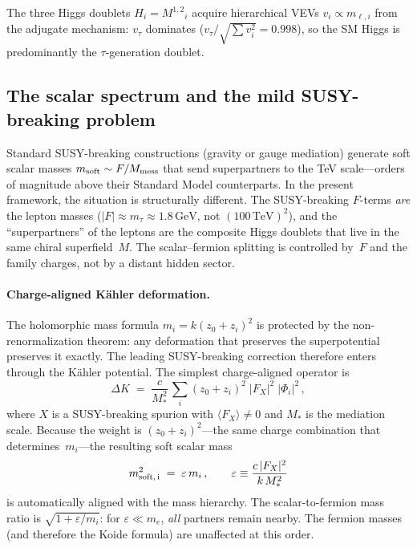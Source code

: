 \documentclass[12pt,a4paper]{article}
\newcommand{\GeV}{\,\mathrm{GeV}}
\newcommand{\TeV}{\,\mathrm{TeV}}
\begin{document}
The three Higgs doublets $H_i = M^{1,2}{}_i$ acquire hierarchical
VEVs $v_i \propto m_{\ell,i}$ from the adjugate mechanism: $v_\tau$
dominates ($v_\tau/\sqrt{\sum v_i^2} = 0.998$), so the SM Higgs is
predominantly the $\tau$-generation doublet.

\subsection{The scalar spectrum and the mild SUSY-breaking problem}
\label{sec:mild}

Standard SUSY-breaking constructions (gravity or gauge mediation)
generate soft scalar masses $m_{\rm soft} \sim F/M_{\rm mess}$ that
send superpartners to the TeV scale---orders of magnitude above their
Standard Model counterparts.  In the present framework, the situation
is structurally different.  The SUSY-breaking $F$-terms \emph{are}
the lepton masses ($|F| \approx m_\tau \approx 1.8\GeV$, not
$(100\TeV)^2$), and the ``superpartners'' of the leptons are the
composite Higgs doublets that live in the same chiral superfield~$M$.
The scalar--fermion splitting is controlled by~$F$ and the family
charges, not by a distant hidden sector.

\paragraph{Charge-aligned K\"ahler deformation.}
The holomorphic mass formula $m_i = k(z_0{+}z_i)^2$ is protected by
the non-renormalization theorem: any deformation that preserves the
superpotential preserves it exactly.  The leading SUSY-breaking
correction therefore enters through the K\"ahler potential.
The simplest charge-aligned operator is
\begin{equation}
  \Delta K \;=\; \frac{c}{M_*^2}\,\sum_i (z_0{+}z_i)^2\;
  |F_X|^2\;|\Phi_i|^2\,,
  \label{eq:DK_spurion}
\end{equation}
where $X$ is a SUSY-breaking spurion with $\langle F_X \rangle \neq 0$
and $M_*$ is the mediation scale.  Because the weight is
$(z_0{+}z_i)^2$---the same charge combination that determines~$m_i$---the
resulting soft scalar mass
\begin{equation}
  m^2_{\rm soft,\,i} \;=\; \varepsilon\,m_i\,,
  \qquad
  \varepsilon \equiv \frac{c\,|F_X|^2}{k\,M_*^2}
  \label{eq:msoft}
\end{equation}
is automatically aligned with the mass hierarchy.  The scalar-to-fermion
mass ratio is $\sqrt{1 + \varepsilon/m_i}$: for
$\varepsilon \ll m_e$, \emph{all} partners remain nearby.  The fermion
masses (and therefore the Koide formula) are unaffected at this order.
\end{document}
